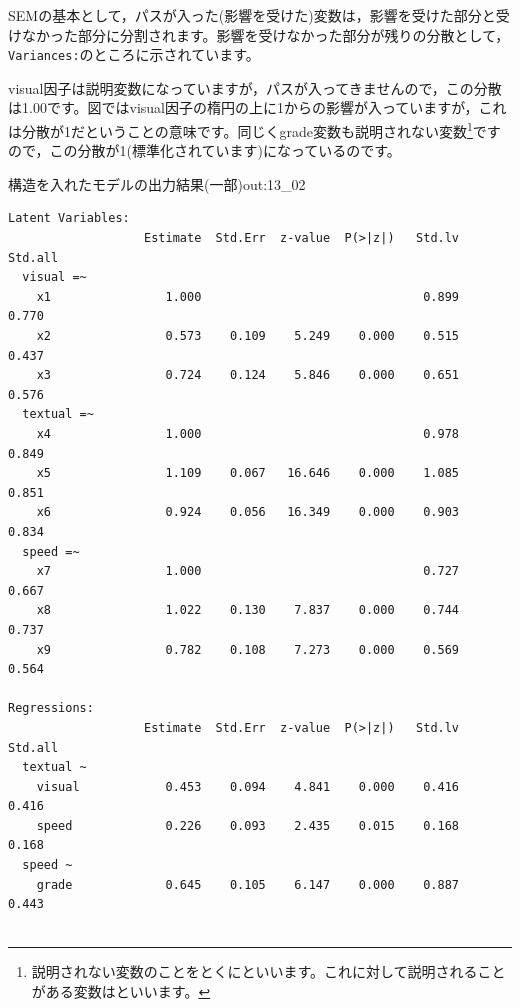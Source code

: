 \documentclass{ltjsbook}
\begin{document}
SEMの基本として，パスが入った(影響を受けた)変数は，影響を受けた部分と受けなかった部分に分割されます。影響を受けなかった部分が残りの分散として，\texttt{Variances:}のところに示されています。

visual因子は説明変数になっていますが，パスが入ってきませんので，この分散は1.00です。図ではvisual因子の楕円の上に1からの影響が入っていますが，これは分散が1だということの意味です。同じくgrade変数も説明されない変数\footnote{説明されない変数のことをとくにといいます。これに対して説明されることがある変数はといいます。}ですので，この分散が1(標準化されています)になっているのです。

\begin{Rscreen}{構造を入れたモデルの出力結果(一部)}{out:13_02}
	\begin{verbatim}
Latent Variables:
                   Estimate  Std.Err  z-value  P(>|z|)   Std.lv  Std.all
  visual =~                                                             
    x1                1.000                               0.899    0.770
    x2                0.573    0.109    5.249    0.000    0.515    0.437
    x3                0.724    0.124    5.846    0.000    0.651    0.576
  textual =~                                                            
    x4                1.000                               0.978    0.849
    x5                1.109    0.067   16.646    0.000    1.085    0.851
    x6                0.924    0.056   16.349    0.000    0.903    0.834
  speed =~                                                              
    x7                1.000                               0.727    0.667
    x8                1.022    0.130    7.837    0.000    0.744    0.737
    x9                0.782    0.108    7.273    0.000    0.569    0.564

Regressions:
                   Estimate  Std.Err  z-value  P(>|z|)   Std.lv  Std.all
  textual ~                                                             
    visual            0.453    0.094    4.841    0.000    0.416    0.416
    speed             0.226    0.093    2.435    0.015    0.168    0.168
  speed ~                                                               
    grade             0.645    0.105    6.147    0.000    0.887    0.443


\end{verbatim}
\end{Rscreen}
\end{document}
